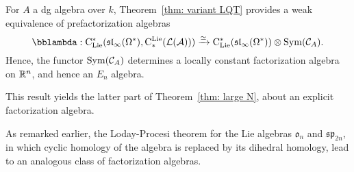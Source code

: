 \documentclass[11pt]{amsart}
\numberwithin{equation}{section}
\begin{document}
\begin{cor}
For $A$ a dg algebra over $k$, Theorem~\ref{thm: variant LQT} provides a weak equivalence of prefactorization algebras
\[
\lqt: \clies(\sl_\infty(\Omega^*), \cliels(\cL(\cA))) \xto{\simeq} \clies(\sl_\infty(\Omega^*)) \otimes \Sym(\cC_A).
\]
Hence, the functor ${\rm Sym}(\mathcal C_A)$ determines a locally constant factorization algebra on $\mathbb R^n$, and hence an $E_n$ algebra.
\end{cor}

This result yields the latter part of Theorem~\ref{thm: large N}, about an explicit factorization algebra.

\begin{rmk}
As remarked earlier, the Loday-Procesi theorem for the Lie algebras $\mathfrak{o}_n$ and $\mathfrak{sp}_{2n}$,
in which cyclic homology of the algebra is replaced by its dihedral homology,
lead to an analogous class of factorization algebras.
\end{rmk}



  


\end{document}
